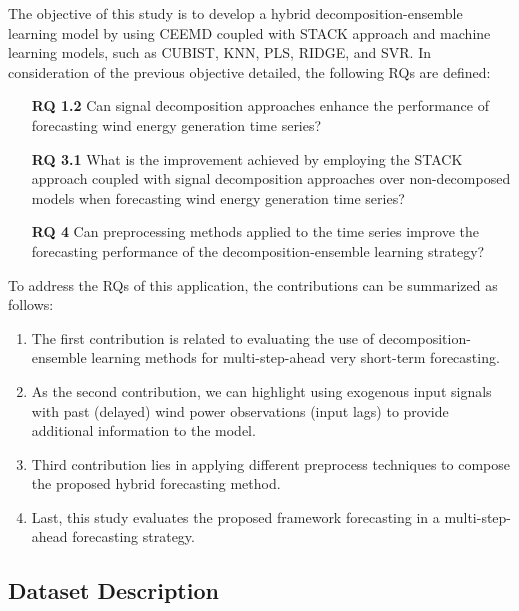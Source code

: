 The objective of this study is to develop a hybrid decomposition-ensemble learning model by using \ac{CEEMD} coupled with \ac{STACK} approach and machine learning models, such as \ac{CUBIST}, \ac{KNN}, \ac{PLS}, \ac{RIDGE}, and \ac{SVR}. In consideration of the previous objective detailed, the following \ac{RQ}s are defined:

\begin{enumerate}[wide=0pt, leftmargin=3em]
    \item[\textbf{RQ 1.2}] Can signal decomposition approaches enhance the performance of forecasting wind energy generation time series?

    \item[\textbf{RQ 3.1}] What is the improvement achieved by employing the \ac{STACK} approach coupled with signal decomposition approaches over non-decomposed models when forecasting wind energy generation time series?

    \item[\textbf{RQ 4}] Can preprocessing methods applied to the time series improve the forecasting performance of the decomposition-ensemble learning strategy?
\end{enumerate}

To address the \ac{RQ}s of this application, the contributions can be summarized as follows: 

\begin{enumerate}[label = \alph*)]
    \item The first contribution is related to evaluating the use of decomposition-ensemble learning methods for multi-step-ahead very short-term forecasting. 
    
    \item As the second contribution, we can highlight using exogenous input signals with past (delayed) wind power observations (input lags) to provide additional information to the model. 
    
    \item Third contribution lies in applying different preprocess techniques to compose the proposed hybrid forecasting method. 
    
    \item Last, this study evaluates the proposed framework forecasting in a multi-step-ahead forecasting strategy. 
\end{enumerate}

\subsection{Dataset Description}

